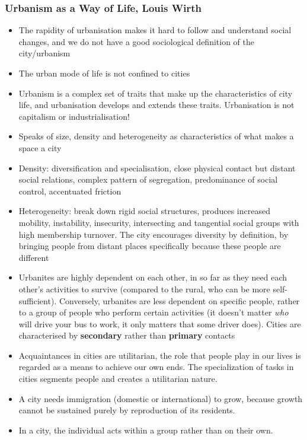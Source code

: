 \documentclass{article}
\begin{document}
\subsubsection{Urbanism as a Way of Life, Louis Wirth}

\begin{itemize}
  \item The rapidity of urbanisation makes it hard to follow and understand social changes, and we do not have a good sociological definition of the city/urbanism
  \item The urban mode of life is not confined to cities
  \item Urbanism is a complex set of traits that make up the characteristics of city life, and urbanisation develops and extends these traits. Urbanisation is not capitalism or industrialisation!
  \item Speaks of size, density and heterogeneity as characteristics of what makes a space a city
  \item Density: diversification and specialisation, close physical contact but distant social relations, complex pattern of segregation, predominance of social control, accentuated friction
  \item Heterogeneity: break down rigid social structures, produces increased mobility, instability, insecurity, intersecting and tangential social groups with high membership turnover. The city encourages diversity by definition, by bringing people from distant places specifically because these people are different
  \item Urbanites are highly dependent on each other, in so far as they need each other's activities to survive (compared to the rural, who can be more self-sufficient). Conversely, urbanites are less dependent on specific people, rather to a group of people who perform certain activities (it doesn't matter \textit{who} will drive your bus to work, it only matters that some driver does). Cities are characterised by \textbf{secondary} rather than \textbf{primary} contacts
  \item Acquaintances in cities are utilitarian, the role that people play in our lives is regarded as a means to achieve our own ends. The specialization of tasks in cities segments people and creates a utilitarian nature.
  \item A city needs immigration (domestic or international) to grow, because growth cannot be sustained purely by reproduction of its residents. 
  \item In a city, the individual acts within a group rather than on their own.
\end{itemize}
\end{document}

